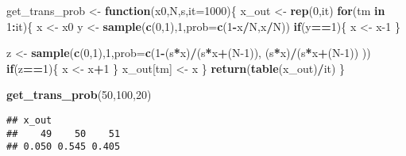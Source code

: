 \documentclass[
]{article}
\newenvironment{Shaded}{\begin{snugshade}}{\end{snugshade}}
\newcommand{\AttributeTok}[1]{\textcolor[rgb]{0.13,0.29,0.53}{#1}}
\newcommand{\ControlFlowTok}[1]{\textcolor[rgb]{0.13,0.29,0.53}{\textbf{#1}}}
\newcommand{\DecValTok}[1]{\textcolor[rgb]{0.00,0.00,0.81}{#1}}
\newcommand{\FunctionTok}[1]{\textcolor[rgb]{0.13,0.29,0.53}{\textbf{#1}}}
\newcommand{\NormalTok}[1]{#1}
\newcommand{\OtherTok}[1]{\textcolor[rgb]{0.56,0.35,0.01}{#1}}
\newcommand{\SpecialCharTok}[1]{\textcolor[rgb]{0.81,0.36,0.00}{\textbf{#1}}}
\begin{document}
\begin{Shaded}
\begin{Highlighting}[]
\NormalTok{get\_trans\_prob }\OtherTok{\textless{}{-}} \ControlFlowTok{function}\NormalTok{(x0,N,s,}\AttributeTok{it=}\DecValTok{1000}\NormalTok{)\{}
\NormalTok{  x\_out }\OtherTok{\textless{}{-}} \FunctionTok{rep}\NormalTok{(}\DecValTok{0}\NormalTok{,it)}
  \ControlFlowTok{for}\NormalTok{(tm }\ControlFlowTok{in} \DecValTok{1}\SpecialCharTok{:}\NormalTok{it)\{}
\NormalTok{    x }\OtherTok{\textless{}{-}}\NormalTok{ x0}
\NormalTok{    y }\OtherTok{\textless{}{-}} \FunctionTok{sample}\NormalTok{(}\FunctionTok{c}\NormalTok{(}\DecValTok{0}\NormalTok{,}\DecValTok{1}\NormalTok{),}\DecValTok{1}\NormalTok{,}\AttributeTok{prob=}\FunctionTok{c}\NormalTok{(}\DecValTok{1}\SpecialCharTok{{-}}\NormalTok{x}\SpecialCharTok{/}\NormalTok{N,x}\SpecialCharTok{/}\NormalTok{N))}
    \ControlFlowTok{if}\NormalTok{(y}\SpecialCharTok{==}\DecValTok{1}\NormalTok{)\{}
\NormalTok{      x }\OtherTok{\textless{}{-}}\NormalTok{ x}\DecValTok{{-}1}
\NormalTok{    \}}
    
\NormalTok{    z }\OtherTok{\textless{}{-}} \FunctionTok{sample}\NormalTok{(}\FunctionTok{c}\NormalTok{(}\DecValTok{0}\NormalTok{,}\DecValTok{1}\NormalTok{),}\DecValTok{1}\NormalTok{,}\AttributeTok{prob=}\FunctionTok{c}\NormalTok{(}\DecValTok{1}\SpecialCharTok{{-}}\NormalTok{(s}\SpecialCharTok{*}\NormalTok{x)}\SpecialCharTok{/}\NormalTok{(s}\SpecialCharTok{*}\NormalTok{x}\SpecialCharTok{+}\NormalTok{(N}\DecValTok{{-}1}\NormalTok{)), (s}\SpecialCharTok{*}\NormalTok{x)}\SpecialCharTok{/}\NormalTok{(s}\SpecialCharTok{*}\NormalTok{x}\SpecialCharTok{+}\NormalTok{(N}\DecValTok{{-}1}\NormalTok{)) ))}
    \ControlFlowTok{if}\NormalTok{(z}\SpecialCharTok{==}\DecValTok{1}\NormalTok{)\{}
\NormalTok{      x }\OtherTok{\textless{}{-}}\NormalTok{ x}\SpecialCharTok{+}\DecValTok{1}
\NormalTok{    \}}
\NormalTok{    x\_out[tm] }\OtherTok{\textless{}{-}}\NormalTok{ x}
\NormalTok{  \}}
  \FunctionTok{return}\NormalTok{(}\FunctionTok{table}\NormalTok{(x\_out)}\SpecialCharTok{/}\NormalTok{it)}
\NormalTok{\}}

\FunctionTok{get\_trans\_prob}\NormalTok{(}\DecValTok{50}\NormalTok{,}\DecValTok{100}\NormalTok{,}\DecValTok{20}\NormalTok{)}
\end{Highlighting}
\end{Shaded}

\begin{verbatim}
## x_out
##    49    50    51 
## 0.050 0.545 0.405
\end{verbatim}
\end{document}
